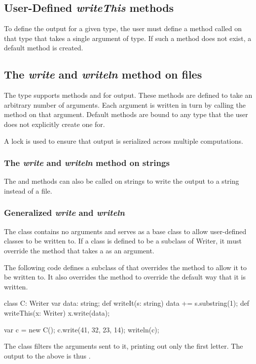 \subsection{User-Defined {\em writeThis} methods}

To define the output for a given type, the user must define a method
called  on that type that takes a single argument of
 type.  If such a method does not exist, a default method is
created.

\subsection{The {\em write} and {\em writeln} method on files}
\label{filewrite}

The  type supports methods  and 
for output.  These methods are defined to take an arbitrary number of
arguments.  Each argument is written in turn by calling
the  method on that argument.
Default  methods are bound to any type that the user
does not explicitly create one for.

A lock is used to ensure that output is serialized across multiple
computations.

\subsubsection{The {\em write} and {\em writeln} method on strings}
\label{stringwrite}

The  and  methods can also be called on
strings to write the output to a string instead of a file.

\subsubsection{Generalized {\em write} and {\em writeln}}
\label{writer}

The  class contains no arguments and serves as a base
class to allow user-defined classes to be written to.  If a class is
defined to be a subclass of Writer, it must override
the  method that takes a  as an argument.

\begin{example}
The following code defines a subclass of  that overrides
the  method to allow it to be written to.  It also
overrides the  method to override the default way that
it is written.
\begin{chapel}
class C: Writer {
  var data: string;
  def writeIt(s: string) {
    data += s.substring(1);
  }
  def writeThis(x: Writer) {
    x.write(data);
  }
}

var c = new C();
c.write(41, 32, 23, 14);
writeln(c);
\end{chapel}
The  class filters the arguments sent to it, printing out only
the first letter.  The output to the above is thus .
\end{example}


